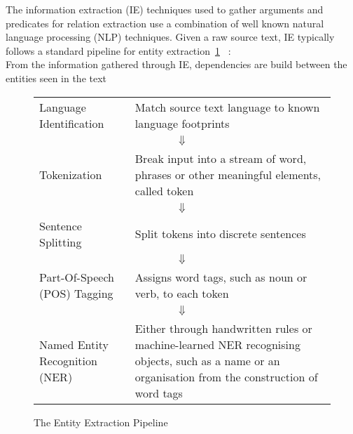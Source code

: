 \documentclass[bsc,frontabs,twoside,singlespacing,parskip,deptreport]{infthesis}     %
\begin{document}
The information extraction (IE) techniques used to gather arguments and predicates for relation extraction use a combination
of well known natural language processing (NLP) techniques. 
Given a raw source text, IE typically follows a standard pipeline for entity extraction~\ref{fig:pipeline} ~\cite{bontcheva2013twitie}:\\
From the information gathered through IE, dependencies are build between the entities seen in the text
\begin{figure}
\begin{tcolorbox}[width=\textwidth,
                  interior hidden,
                  boxsep=10pt,
                  left=0pt,
                  right=0pt,
                  top=2pt]

 \begin{tabularx}{\linewidth}{lX}

 Language Identification &  Match source text language to known language footprints\vspace{1em}\\
  \multicolumn{2}{c}{$\Downarrow$} \\
 Tokenization &  Break input into a stream of word, phrases or other meaningful elements, called token\vspace{1em}\\

  \multicolumn{2}{c}{$\Downarrow$} \\
 Sentence Splitting &  Split tokens into discrete sentences\vspace{1em}\\

  \multicolumn{2}{c}{$\Downarrow$} \\
 Part-Of-Speech (POS) Tagging &   Assigns word tags, such as noun or verb, to each token\vspace{1em} \\

  \multicolumn{2}{c}{$\Downarrow$} \\
 Named Entity Recognition (NER) &   Either through handwritten rules or machine-learned NER recognising objects, such as a name or an
    organisation from the construction of word tags

 \end{tabularx}
\end{tcolorbox}
\caption{The Entity Extraction Pipeline}
\label{fig:pipeline}
\end{figure}
\end{document}
